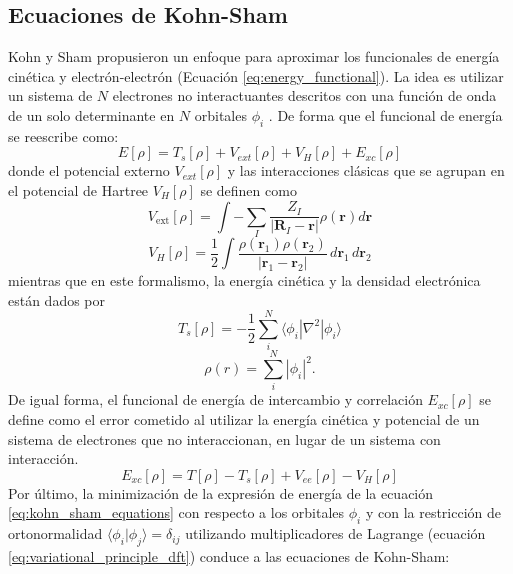 \subsection{Ecuaciones de Kohn-Sham}
Kohn y Sham propusieron un enfoque para aproximar los funcionales de energía cinética y electrón-electrón (Ecuación \ref{eq:energy_functional}). La idea es utilizar un sistema de $N$ electrones no interactuantes descritos con una función de onda de un solo determinante en $N$ orbitales $\phi_i$ \cite{jensen2017introduction,LeonPimentel2019}. De forma que el funcional de energía se reescribe como:
\begin{equation}
    E[\rho] = T_s[\rho] + V_{ext}[\rho] + V_H[\rho] + E_{xc}[\rho]
    \label{eq:kohn_sham_equations}
\end{equation}
donde el potencial externo $V_{ext}[\rho]$ y las interacciones clásicas que se agrupan en el potencial de Hartree $V_H[\rho]$ se definen como
\begin{equation}
    V_{\text{ext}}[\rho] =  \int - \sum_{I} \frac{Z_{I}}{|\mathbf{R}_{I} - \mathbf{r}|} \rho(\mathbf{r}) d\mathbf{r} 
    \label{eq:external_potential_dft}
\end{equation}
\begin{equation}
    V_H[\rho] = \frac{1}{2} \int \frac{\rho(\mathbf{r}_1)\rho(\mathbf{r}_2)}{|\mathbf{r}_1 - \mathbf{r}_2|} \, d\mathbf{r}_1 \, d\mathbf{r}_2 
    \label{eq:hartree_potential_dft}
    \end{equation}
mientras que en este formalismo, la energía cinética y la densidad electrónica están dados por 
\begin{equation}
    T_s[\rho] = -\frac{1}{2} \sum_{i}^{N} \langle \phi_i | \nabla^2 | \phi_i \rangle \label{eq:kinetic_energy_ks}
\end{equation}
\begin{equation}
    \rho(r) = \sum_{i}^{N} |\phi_i|^2. \label{eq:density_ks}
\end{equation}
De igual forma, el funcional de energía de intercambio y correlación $E_{xc}[\rho]$ se define como el error cometido al utilizar la energía cinética y potencial de un sistema de electrones que no interaccionan, en lugar de un sistema con interacción.
\begin{equation}
    E_{xc}[\rho] = T[\rho] - T_s[\rho] + V_{ee}[\rho] - V_H[\rho] 
    \label{eq:exchange_correlation_functional}
\end{equation}
Por último, la minimización de la expresión de energía de la ecuación \ref{eq:kohn_sham_equations} con respecto a los orbitales $\phi_i$ y con la restricción de ortonormalidad $\langle \phi_i | \phi_j \rangle = \delta_{ij}$ utilizando multiplicadores de Lagrange (ecuación \ref{eq:variational_principle_dft}) conduce a las ecuaciones de Kohn-Sham:
